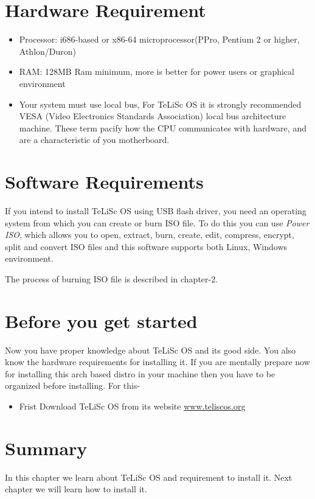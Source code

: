 \section{Hardware Requirement}
\label{sec:1.3}
\begin{itemize}
    \item Processor: i686-based or x86-64 microprocessor(PPro, Pentium 2 or higher, Athlon/Duron)
    \item RAM: 128MB Ram minimum, more is better for power users or graphical environment
    \item Your system must use local bus, For TeLiSc OS it is strongly recommended VESA (Video Electronics Standards Association) local bus architecture machine. These term pacify how the CPU communicates with hardware, and are a characteristic of you motherboard. 
\end{itemize}

\section{Software Requirements}
\label{sec:1.4}
If you intend to install TeLiSc OS using USB flash driver, you need an operating system from which you can create or burn ISO file. To do this you can use \textit{Power ISO}, which allows you to open, extract, burn, create, edit, compress, encrypt, split and convert ISO files and this software supports both Linux, Windows environment. 

The process of burning ISO file is described in chapter-2. 


\section{Before you get started}
\label{sec:1.5}
Now you have proper knowledge about TeLiSc OS and its good side. You also know the hardware requirements for installing it. If you are mentally prepare now for installing this arch based distro in your machine then you have to be organized before installing. For this-

\begin{itemize}
    \item Frist Download TeLiSc OS from its website \url{www.teliscos.org}
\end{itemize}
\section{Summary} 
\label{sec:1.6}
In this chapter  we learn about TeLiSc OS and requirement to install it. Next chapter we will learn how to install it.


















